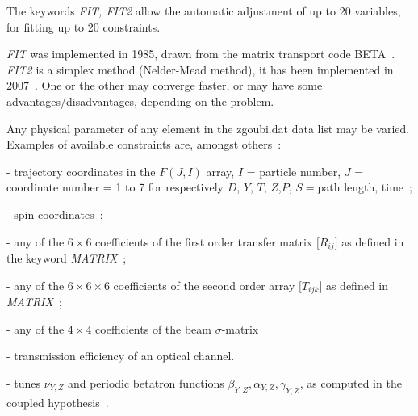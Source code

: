  The keywords \textsl{FIT, FIT2} allow the automatic adjustment of up to 20 
variables, for fitting up to 20 constraints. 

\medskip 

 \noindent 
\textsl{FIT} was implemented in 1985, drawn from  the matrix transport code BETA~\cite{Biblio10}. 
\textsl{FIT2} is a simplex method (Nelder-Mead method), it has been implemented  in 2007~\cite{NelderMead}.   
One or the other may converge 
faster, or may have some advantages/disadvantages,  depending on the problem. 

\medskip 
\noindent Any physical parameter of any element in the zgoubi.dat data list may 
be varied. Examples of available constraints  are, amongst others~:  

\noindent -  trajectory coordinates in the  $ F(J,I) $ array, 
$ I $  =  particle number, $ J $  = coordinate number = 1 to 7 for 
respectively $ D$, $Y$, $T$, $Z$,$ P $, $ S= $path length, time~;

\noindent -  spin coordinates~;

\noindent - any of the $6 \times 6$
coefficients of the first order transfer matrix $ \lbrack R_{ij}\rbrack $ as defined in the
keyword \textsl{MATRIX}~; 


\noindent - any of the
$6\times 6 \times6 $ coefficients of the second order array $ \lbrack T_{ijk}\rbrack $ 
as defined in \textsl{MATRIX}~; 

\noindent - any of the $ 4 \times 4 $ coefficients of the beam \mbox{$\sigma$-matrix} 

\noindent - transmission efficiency of an optical channel. 

\noindent - tunes $\nu_{Y,Z}$ and  periodic betatron functions $\beta_{Y,Z}, \alpha_{Y,Z}, \gamma_{Y,Z}$,  
 as computed in the coupled hypothesis~\cite{Coupling}. 



